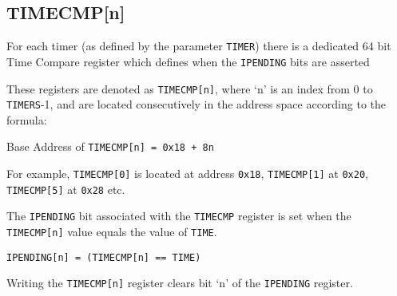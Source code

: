\subsection{TIMECMP[n]}\label{timecmpn}

For each timer (as defined by the parameter \texttt{TIMER}) there is a dedicated
64 bit Time Compare register which defines when the \texttt{IPENDING} bits are
asserted

These registers are denoted as \texttt{TIMECMP[n]}, where `n' is an index
from 0 to \texttt{TIMERS}-1, and are located consecutively in the address space
according to the formula:

Base Address of \texttt{TIMECMP[n] = 0x18 + 8n}

For example, \texttt{TIMECMP[0]} is located at address \texttt{0x18}, \texttt{TIMECMP[1]}
at \texttt{0x20}, \texttt{TIMECMP[5]} at \texttt{0x28} etc.

The \texttt{IPENDING} bit associated with the \texttt{TIMECMP} register is set when the
\texttt{TIMECMP[n]} value equals the value of \texttt{TIME}.

\texttt{IPENDING[n] = (TIMECMP[n] == TIME)}

Writing the \texttt{TIMECMP[n]} register clears bit `n' of the \texttt{IPENDING}
register.

